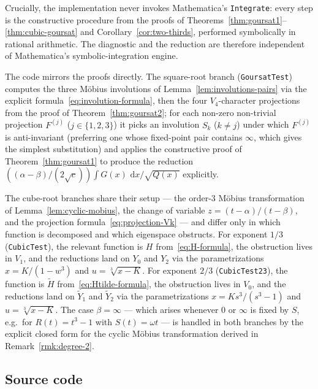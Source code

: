 \documentclass[11pt,a4paper]{article}
\theoremstyle{plain}
\theoremstyle{definition}
\theoremstyle{remark}
\renewcommand{\d}{\,\mathrm{d}}
\begin{document}
Crucially, the implementation never invokes Mathematica's \texttt{Integrate}: every step is the constructive procedure from the proofs of Theorems~\ref{thm:goursat1}--\ref{thm:cubic-goursat} and Corollary~\ref{cor:two-thirds}, performed symbolically in rational arithmetic. The diagnostic and the reduction are therefore independent of Mathematica's symbolic-integration engine.

The code mirrors the proofs directly. The square-root branch (\texttt{GoursatTest}) computes the three M\"obius involutions of Lemma~\ref{lem:involutions-pairs} via the explicit formula~\eqref{eq:involution-formula}, then the four $V_4$-character projections from the proof of Theorem~\ref{thm:goursat2}; for each non-zero non-trivial projection $F^{(j)}$ ($j\in\{1,2,3\}$) it picks an involution $S_k$ ($k\neq j$) under which $F^{(j)}$ is anti-invariant (preferring one whose fixed-point pair contains $\infty$, which gives the simplest substitution) and applies the constructive proof of Theorem~\ref{thm:goursat1} to produce the reduction $((\alpha-\beta)/(2\sqrt{c}))\int G(x)\,\d x/\sqrt{Q(x)}$ explicitly.

The cube-root branches share their setup --- the order-$3$ M\"obius transformation of Lemma~\ref{lem:cyclic-mobius}, the change of variable $z=(t-\alpha)/(t-\beta)$, and the projection formula~\eqref{eq:projection-Vk} --- and differ only in which function is decomposed and which eigenspace obstructs. For exponent $1/3$ (\texttt{CubicTest}), the relevant function is $H$ from~\eqref{eq:H-formula}, the obstruction lives in $V_1$, and the reductions land on $Y_0$ and $Y_2$ via the parametrizations $x=K/(1-w^3)$ and $u=\sqrt[3]{x-K}$. For exponent $2/3$ (\texttt{CubicTest23}), the function is $\widetilde H$ from~\eqref{eq:Htilde-formula}, the obstruction lives in $V_0$, and the reductions land on $\widetilde Y_1$ and $\widetilde Y_2$ via the parametrizations $x=Ks^3/(s^3-1)$ and $u=\sqrt[3]{x-K}$. The case $\beta=\infty$ --- which arises whenever $0$ or $\infty$ is fixed by $S$, e.g.\ for $R(t)=t^3-1$ with $S(t)=\omega t$ --- is handled in both branches by the explicit closed form for the cyclic M\"obius transformation derived in Remark~\ref{rmk:degree-2}.

\subsection*{Source code}
\end{document}
